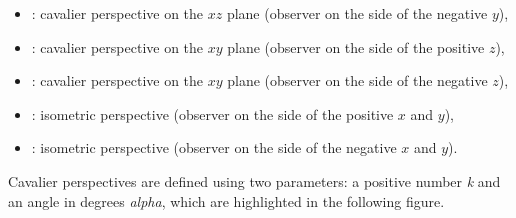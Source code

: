 \begin{itemize}
\begin{itemize}
    \item {}: cavalier perspective on the $xz$ plane (observer on the side of the negative $y$),

    \item {}: cavalier perspective on the $xy$ plane (observer on the side of the positive $z$),

    \item {}: cavalier perspective on the $xy$ plane (observer on the side of the negative $z$),

    \item {}: isometric perspective (observer on the side of the positive $x$ and $y$),

    \item {}: isometric perspective (observer on the side of the negative $x$ and $y$).
\end{itemize}

Cavalier perspectives are defined using two parameters: a positive number \emph{k} and an angle in degrees \emph{alpha}, which are highlighted in the following figure.

\end{itemize}

